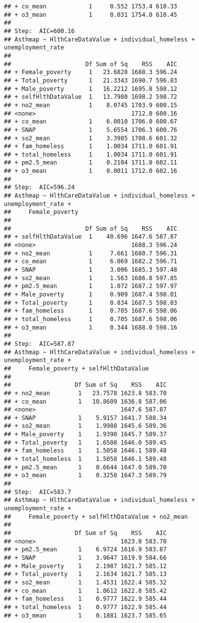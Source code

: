 \documentclass[
]{article}
\begin{document}
\begin{verbatim}
## + co_mean            1     0.552 1753.4 610.33
## + o3_mean            1     0.031 1754.0 610.45
## 
## Step:  AIC=600.16
## Asthmap ~ HlthCareDataValue + individual_homeless + unemployment_rate
## 
##                     Df Sum of Sq    RSS    AIC
## + Female_poverty     1   23.6828 1688.3 596.24
## + Total_poverty      1   21.3343 1690.7 596.83
## + Male_poverty       1   16.2212 1695.8 598.12
## + selfHlthDataValue  1   13.7980 1698.2 598.72
## + no2_mean           1    8.0745 1703.9 600.15
## <none>                           1712.0 600.16
## + co_mean            1    6.0010 1706.0 600.67
## + SNAP               1    5.6554 1706.3 600.76
## + so2_mean           1    3.3985 1708.6 601.32
## + fam_homeless       1    1.0034 1711.0 601.91
## + total_homeless     1    1.0034 1711.0 601.91
## + pm2.5_mean         1    0.2104 1711.8 602.11
## + o3_mean            1    0.0011 1712.0 602.16
## 
## Step:  AIC=596.24
## Asthmap ~ HlthCareDataValue + individual_homeless + unemployment_rate + 
##     Female_poverty
## 
##                     Df Sum of Sq    RSS    AIC
## + selfHlthDataValue  1    40.696 1647.6 587.87
## <none>                           1688.3 596.24
## + no2_mean           1     7.661 1680.7 596.31
## + co_mean            1     6.069 1682.2 596.71
## + SNAP               1     3.006 1685.3 597.48
## + so2_mean           1     1.563 1686.8 597.85
## + pm2.5_mean         1     1.072 1687.2 597.97
## + Male_poverty       1     0.909 1687.4 598.01
## + Total_poverty      1     0.834 1687.5 598.03
## + fam_homeless       1     0.705 1687.6 598.06
## + total_homeless     1     0.705 1687.6 598.06
## + o3_mean            1     0.344 1688.0 598.16
## 
## Step:  AIC=587.87
## Asthmap ~ HlthCareDataValue + individual_homeless + unemployment_rate + 
##     Female_poverty + selfHlthDataValue
## 
##                  Df Sum of Sq    RSS    AIC
## + no2_mean        1   23.7578 1623.8 583.70
## + co_mean         1   10.8609 1636.8 587.06
## <none>                        1647.6 587.87
## + SNAP            1    5.9157 1641.7 588.34
## + so2_mean        1    1.9988 1645.6 589.36
## + Male_poverty    1    1.9390 1645.7 589.37
## + Total_poverty   1    1.6508 1646.0 589.45
## + fam_homeless    1    1.5058 1646.1 589.48
## + total_homeless  1    1.5058 1646.1 589.48
## + pm2.5_mean      1    0.6644 1647.0 589.70
## + o3_mean         1    0.3250 1647.3 589.79
## 
## Step:  AIC=583.7
## Asthmap ~ HlthCareDataValue + individual_homeless + unemployment_rate + 
##     Female_poverty + selfHlthDataValue + no2_mean
## 
##                  Df Sum of Sq    RSS    AIC
## <none>                        1623.8 583.70
## + pm2.5_mean      1    6.9724 1616.9 583.87
## + SNAP            1    3.9647 1619.9 584.66
## + Male_poverty    1    2.1987 1621.7 585.12
## + Total_poverty   1    2.1634 1621.7 585.13
## + so2_mean        1    1.4531 1622.4 585.32
## + co_mean         1    1.0612 1622.8 585.42
## + fam_homeless    1    0.9777 1622.9 585.44
## + total_homeless  1    0.9777 1622.9 585.44
## + o3_mean         1    0.1881 1623.7 585.65
\end{verbatim}
\end{document}
